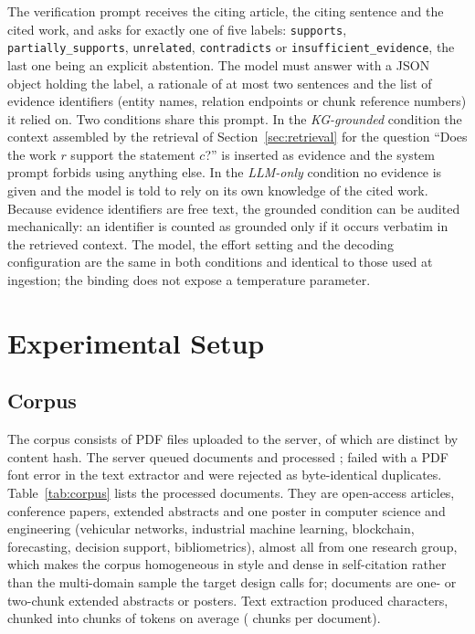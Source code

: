 \documentclass[lettersize,journal]{IEEEtran}
\begin{document}
The verification prompt receives the citing article, the citing sentence and the cited work, and asks for exactly one of five labels: \texttt{supports}, \texttt{partially\_supports}, \texttt{unrelated}, \texttt{contradicts} or \texttt{insufficient\_evidence}, the last one being an explicit abstention. The model must answer with a JSON object holding the label, a rationale of at most two sentences and the list of evidence identifiers (entity names, relation endpoints or chunk reference numbers) it relied on. Two conditions share this prompt. In the \emph{KG-grounded} condition the context assembled by the retrieval of Section~\ref{sec:retrieval} for the question ``Does the work $r$ support the statement $c$?'' is inserted as evidence and the system prompt forbids using anything else. In the \emph{LLM-only} condition no evidence is given and the model is told to rely on its own knowledge of the cited work. Because evidence identifiers are free text, the grounded condition can be audited mechanically: an identifier is counted as grounded only if it occurs verbatim in the retrieved context. The model, the effort setting and the decoding configuration are the same in both conditions and identical to those used at ingestion; the binding does not expose a temperature parameter.

\section{Experimental Setup}
\label{sec:setup}

\subsection{Corpus}

The corpus consists of \nPdfFiles{} PDF files uploaded to the server, of which \nPdfDistinct{} are distinct by content hash. The server queued \nDocsQueued{} documents and processed \nDocsProcessed{}; \nDocsFailedFont{} failed with a PDF font error in the text extractor and \nDocsFailedDup{} were rejected as byte-identical duplicates. Table~\ref{tab:corpus} lists the processed documents. They are open-access articles, conference papers, extended abstracts and one poster in computer science and engineering (vehicular networks, industrial machine learning, blockchain, forecasting, decision support, bibliometrics), almost all from one research group, which makes the corpus homogeneous in style and dense in self-citation rather than the multi-domain sample the target design calls for; \nShortDocs{} documents are one- or two-chunk extended abstracts or posters. Text extraction produced \nChars{} characters, chunked into \nChunks{} chunks of \meanTokensChunk{} tokens on average (\meanChunksDoc{} chunks per document).
\end{document}

